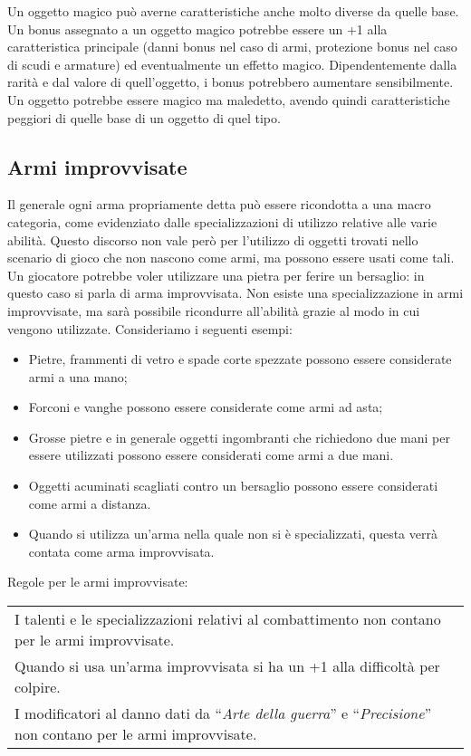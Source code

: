 \documentclass[../manuale_main.tex]{subfiles}
\begin{document}
Un oggetto magico può averne caratteristiche anche molto diverse da quelle base.
Un bonus assegnato a un oggetto magico potrebbe essere un +1 alla caratteristica principale (danni bonus nel caso di armi, protezione bonus nel caso di scudi e armature) ed eventualmente un effetto magico.
Dipendentemente dalla rarità e dal valore di quell'oggetto, i bonus potrebbero aumentare sensibilmente.
Un oggetto potrebbe essere magico ma maledetto, avendo quindi caratteristiche peggiori di quelle base di un oggetto di quel tipo.

\subsection{Armi improvvisate}

Il generale ogni arma propriamente detta può essere ricondotta a una macro categoria, come evidenziato dalle specializzazioni di utilizzo relative alle varie abilità.
Questo discorso non vale però per l'utilizzo di oggetti trovati nello scenario di gioco che non nascono come armi, ma possono essere usati come tali. Un giocatore potrebbe voler utilizzare una pietra per ferire un bersaglio: in questo caso si parla di arma improvvisata.
Non esiste una specializzazione in armi improvvisate, ma sarà possibile ricondurre all'abilità grazie al modo in cui vengono utilizzate. Consideriamo i seguenti esempi:
\begin{itemize}
\item Pietre, frammenti di vetro e spade corte spezzate possono essere considerate armi a una mano;
\item Forconi e vanghe possono essere considerate come armi ad asta;
\item Grosse pietre e in generale oggetti ingombranti che richiedono due mani per essere utilizzati possono essere considerati come armi a due mani.
\item Oggetti acuminati scagliati contro un bersaglio possono essere considerati come armi a distanza.
\item Quando si utilizza un'arma nella quale non si è specializzati, questa verrà contata come arma improvvisata.
\end{itemize}
Regole per le armi improvvisate:\\
\renewcommand{\arraystretch}{1.5}
\begin{tabularx}{\linewidth}{X}
I talenti e le specializzazioni relativi al combattimento non contano per le armi improvvisate.\\
Quando si usa un'arma improvvisata si ha un +1 alla difficoltà per colpire.\\
I modificatori al danno dati da “\emph{Arte della guerra}” e “\emph{Precisione}” non contano per le armi improvvisate.\\
\end{tabularx}
\end{document}
